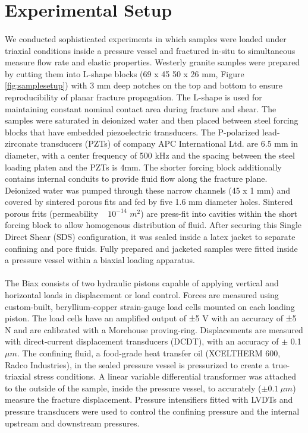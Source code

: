 

\section{Experimental Setup}
\label{sec:experimnt_setup}

\paragraph{} We conducted sophisticated experiments in which samples were loaded under triaxial conditions inside a pressure vessel and fractured in-situ to simultaneous measure flow rate and elastic properties. Westerly granite samples were prepared by cutting them into L-shape blocks (69 x 45 50 x 26 mm, Figure \ref{fig:samplesetup}) with 3 mm deep notches on the top and bottom to ensure reproducibility of planar fracture propagation. The L-shape is used for maintaining constant nominal contact area during fracture and shear. The samples were saturated in deionized water and then placed between steel forcing blocks that have embedded piezoelectric transducers. The P-polarized lead-zirconate transducers (PZTs) of company APC International Ltd. are 6.5 mm in diameter, with a center frequency of 500 kHz and the spacing between the steel loading platen and the PZTs is 4mm. The shorter forcing block additionally contains internal conduits to provide fluid flow along the fracture plane. Deionized water was pumped through these narrow channels (45 x 1 mm) and covered by sintered porous fits and fed by five 1.6 mm diameter holes. Sintered porous frits (permeability ~ $10^{-14}$ $m^2$) are press-fit into cavities within the short forcing block to allow homogenous distribution of fluid. After securing this Single Direct Shear (SDS) configuration, it was sealed inside a latex jacket to separate confining and pore fluids. Fully prepared and jacketed samples were fitted inside a pressure vessel within a biaxial loading apparatus.

\paragraph{} The Biax consists of two hydraulic pistons capable of applying vertical and horizontal loads in displacement or load control. Forces are measured using custom-built, beryllium-copper strain-gauge load cells mounted on each loading piston. The load cells have an amplified output of ±5 V with an accuracy of ±5 N and are calibrated with a Morehouse proving-ring. Displacements are measured with direct-current displacement transducers (DCDT), with an accuracy of $\pm$ 0.1 $\mu m$. The confining fluid, a food-grade heat transfer oil (XCELTHERM 600, Radco Industries), in the sealed pressure vessel is pressurized to create a true-triaxial stress conditions. A linear variable differential transformer was attached to the outside of the sample, inside the pressure vessel, to accurately ($\pm 0.1\ \mu m$) measure the fracture displacement. Pressure intensifiers fitted with LVDTs and pressure transducers were used to control the confining pressure and the internal upstream and downstream pressures. 

